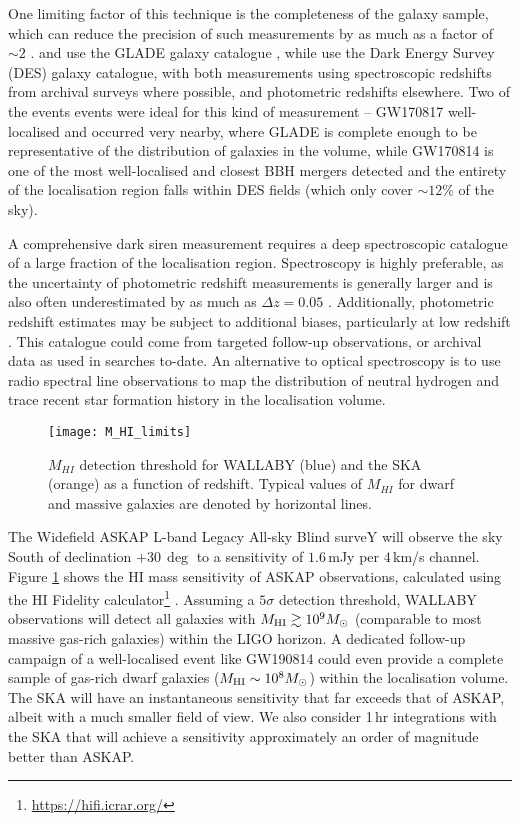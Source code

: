 One limiting factor of this technique is the completeness of the galaxy sample, which can reduce the precision of such measurements by as much as a factor of $\sim 2$ \citep{2020PhRvD.101l2001G}. \citet{2019ApJ...871L..13F} and \citet{2020ApJ...896L..44A} use the GLADE galaxy catalogue \citep{2018MNRAS.479.2374D}, while \citet{2019ApJ...876L...7S} use the Dark Energy Survey (DES) galaxy catalogue, with both measurements using spectroscopic redshifts from archival surveys where possible, and photometric redshifts elsewhere. Two of the events events were ideal for this kind of measurement -- GW170817 well-localised and occurred very nearby, where GLADE is complete enough to be representative of the distribution of galaxies in the volume, while GW170814 is one of the most well-localised and closest BBH mergers detected and the entirety of the localisation region falls within DES fields (which only cover $\sim 12\%$ of the sky).

A comprehensive dark siren measurement requires a deep spectroscopic catalogue of a large fraction of the localisation region. Spectroscopy is highly preferable, as the uncertainty of photometric redshift measurements is generally larger and is also often underestimated by as much as $\Delta z=0.05$ \citep{2008A&A...480..703H}. Additionally, photometric redshift estimates may be subject to additional biases, particularly at low redshift \citep{2014ApJS..210....9B}. This catalogue could come from targeted follow-up observations, or archival data as used in searches to-date. An alternative to optical spectroscopy is to use radio spectral line observations to map the distribution of neutral hydrogen and trace recent star formation history in the localisation volume.

\begin{figure}
    \centering
    \texttt{[image: M\_HI\_limits]}
    \caption[Detection of neutral hydrogen with ASKAP and the SKA]{$M_{HI}$ detection threshold for WALLABY (blue) and the SKA (orange) as a function of redshift. Typical values of $M_{HI}$ for dwarf and massive galaxies are denoted by horizontal lines.}
    \label{fig:m_HI_limits}
\end{figure}

The Widefield ASKAP L-band Legacy All-sky Blind surveY \citep[WALLABY][]{2020arXiv200207311K} will observe the sky South of declination $+30\,\deg$ to a sensitivity of $1.6\,$mJy per $4\,$km/s channel. Figure \ref{fig:m_HI_limits} shows the HI mass sensitivity of ASKAP observations, calculated using the HI Fidelity calculator\footnote{\url{https://hifi.icrar.org/}} \citep{2017PASA...34...52M}. Assuming a $5\sigma$ detection threshold, WALLABY observations will detect all galaxies with $M_{\rm HI}\gtrsim 10^{9}M_{\odot}$ (comparable to most massive gas-rich galaxies) within the LIGO horizon. A dedicated follow-up campaign of a well-localised event like GW190814 could even provide a complete sample of gas-rich dwarf galaxies ($M_{\rm HI}\sim 10^{8}M_{\odot}$) within the localisation volume. The SKA will have an instantaneous sensitivity that far exceeds that of ASKAP, albeit with a much smaller field of view. We also consider 1\,hr integrations with the SKA that will achieve a sensitivity approximately an order of magnitude better than ASKAP.

